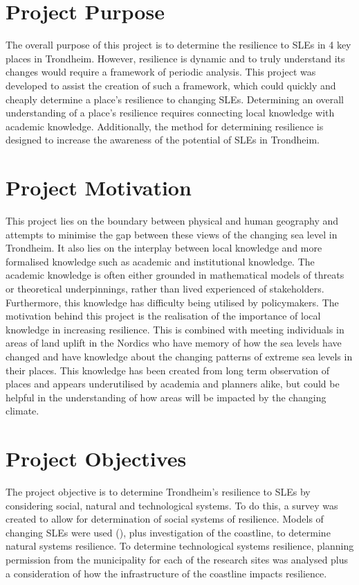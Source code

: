 \paragraph{}

\section{Project Purpose}
The overall purpose of this project is to determine the resilience to SLEs in 4 key places in Trondheim. However, resilience is dynamic and to truly understand its changes would require a framework of periodic analysis. This project was developed to assist the creation of such a framework, which could quickly and cheaply determine a place's resilience to changing SLEs. Determining an overall understanding of a place's resilience requires connecting local knowledge with academic knowledge. Additionally, the method for determining resilience is designed to increase the awareness of the potential of SLEs in Trondheim. 

\section{Project Motivation}
 This project lies on the boundary between physical and human geography and attempts to minimise the gap between these views of the changing sea level in Trondheim. It also lies on the interplay between local knowledge and more formalised knowledge such as academic and institutional knowledge. The academic knowledge is often either grounded in mathematical models of threats or theoretical underpinnings, rather than lived experienced of stakeholders. Furthermore, this knowledge has difficulty being utilised by policymakers. The motivation behind this project is the realisation of the importance of local knowledge in increasing resilience. This is combined with meeting individuals in areas of land uplift in the Nordics who have memory of how the sea levels have changed and have knowledge about the changing patterns of extreme sea levels in their places. This knowledge has been created from long term observation of places and appears underutilised by academia and planners alike, but could be helpful in the understanding of how areas will be impacted by the changing climate. 



\section{Project Objectives}
The project objective is to determine Trondheim's resilience to SLEs by considering social, natural and technological systems. To do this, a survey was created to allow for determination of social systems of resilience.  Models of changing SLEs were used (\cite{kartverket_se_2020}), plus investigation of the coastline, to determine natural systems resilience. To determine technological systems resilience, planning permission from the municipality for each of the research sites was analysed plus a consideration of how the infrastructure of the coastline impacts resilience.

